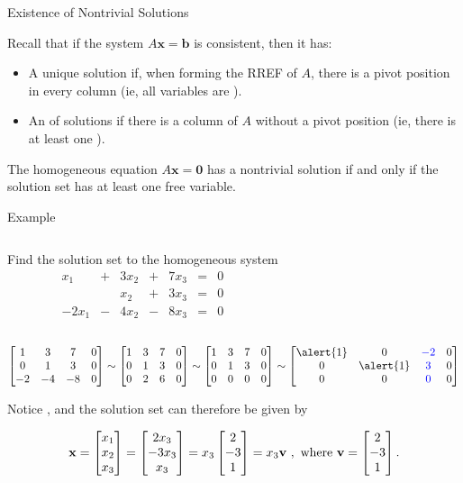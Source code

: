 \documentclass[xcolor=dvipsnames,aspectratio=169,t]{beamer}
\begin{document}
\begin{frame}{Existence of Nontrivial Solutions}

  Recall that if the system $A \mathbf{x} = \mathbf{b}$ is \alert{consistent}, then it has:
  \begin{itemize}
  \item A \alert{unique solution} if, when forming the RREF of $A$, there is a pivot position in every column (ie, all variables are ).
  \item An  of solutions if there is a column of $A$ without a pivot position (ie, there is at least one ).
  \end{itemize}
  \bigskip

  \begin{theorem}
  The homogeneous equation $A\mathbf{x} = \mathbf{0}$ has a nontrivial solution if and only if the solution set has at least one free variable.
  \end{theorem}

\end{frame}

\begin{frame}{Example}
\medskip
   
    \begin{columns}
      \column{0.6\tw}
     Find the solution set to the \alert{homogeneous} system
    \[   \begin{array}{ccccccc}
     x_1 & + & 3x_2 & + &7 x_3&=&0\\
     &  & x_2 & + & 3x_3 &=& 0\\
    -2x_1 & - & 4x_2 & - & 8x_3 &=& 0
    \end{array}  \]

    \column{0.4\tw}
    \end{columns}
  
  \bigskip
    
\[ \bbm 1 & 3 & 7 & 0\\
0 & 1 & 3 & 0\\
-2 & -4 & -8 & 0 \ebm \sim
\bbm 1 & 3 & 7 & 0\\
0 & 1 & 3 & 0\\
0 & 2 & 6 & 0 \ebm \sim
\bbm 1 & 3 & 7 & 0\\
0 & 1 & 3 & 0\\
0 & 0 & 0 & 0 \ebm \sim
\bbm \alert{1} & 0 & \colorb{-2} & 0\\
0 & \alert{1} & \colorb{3} & 0\\
0 & 0 & \colorb{0} & 0 \ebm \]
\smallskip

Notice , and the solution set can therefore be given by

\[ \mathbf{x} = \begin{bmatrix} x_1 \\ x_2 \\ x_3 \end{bmatrix} = \begin{bmatrix} 2x_3 \\ -3x_3 \\ x_3 \end{bmatrix} =  x_3 \begin{bmatrix} 2 \\ -3 \\ 1 \end{bmatrix} = x_3 \mathbf{v} \ , \mbox{ where } \mathbf{v} = \begin{bmatrix} 2 \\ -3 \\ 1 \end{bmatrix} . \]
\end{frame}
\end{document}
